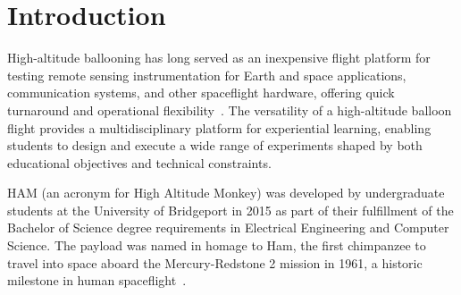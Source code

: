 \section{Introduction}
\vspace{-2em}

High-altitude ballooning has long served as an inexpensive flight platform for testing remote sensing instrumentation for Earth and space applications, communication systems, and other spaceflight hardware, offering quick turnaround and operational flexibility~\cite{HAB_Fundamentals}. The versatility of a high-altitude balloon flight provides a multidisciplinary platform for experiential learning, enabling students to design and execute a wide range of experiments shaped by both educational objectives and technical constraints. \par

HAM (an acronym for High Altitude Monkey) was developed by undergraduate students at the University of Bridgeport in 2015 as part of their fulfillment of the Bachelor of Science degree requirements in Electrical Engineering and Computer Science. The payload was named in homage to Ham, the first chimpanzee to travel into space aboard the Mercury-Redstone 2 mission in 1961, a historic milestone in human spaceflight~\cite{Burgess2014}. 

